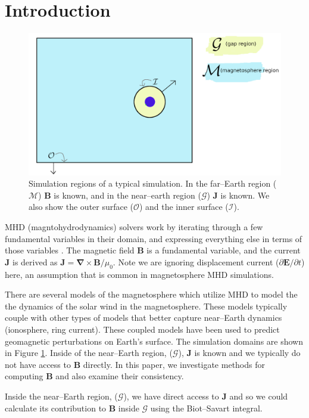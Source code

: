 \documentclass{article}
\newcommand\B{\mathbf{B}}
\newcommand\J{\mathbf{J}}
\newcommand\M{\mathcal{M}}
\newcommand\G{\mathcal{G}}
\newcommand\I{\mathcal{I}}
\newcommand\Out{\mathcal{O}}
\begin{document}
\section{Introduction}

\begin{figure}[H]
  \includegraphics[width=\textwidth]{regions.png}
  \caption{Simulation regions of a typical simulation.
    In the far--Earth region ($\M$) $\B$ is known, and in the near--earth region ($\G$) $\J$ is known.
We also show the outer surface ($\Out$) and the inner surface ($\I$).
    }
  \label{regions}
\end{figure}

MHD (magntohydrodynamics) solvers work by iterating through a few fundamental variables in their domain, and expressing everything else in terms of those variables \citep{Ledvina2008}. The magnetic field $\mathbf{B}$ is a fundamental variable, and the current $\mathbf{J}$ is derived as $\mathbf{J} = \boldsymbol{\nabla} \times \mathbf{B}/\mu_0$. Note we are ignoring displacement current (${\partial \mathbf{E}}/{\partial t}$) here, an assumption that is common in magnetosphere MHD simulations.

There are several models of the magnetosphere which utilize MHD to model the the dynamics of the solar wind in the magnetosphere.
These models typically couple with other types of models that better capture near--Earth dynamics (ionosphere, ring current).
These coupled models have been used to predict geomagnetic perturbations on Earth's surface.
The simulation domains are shown in Figure \ref{regions}. Inside of
the near--Earth region, ($\G$), $\J$ is known and we typically do not have access to $\B$ directly.
In this paper, we investigate methods for computing $\B$ and also examine their consistency.

Inside the near--Earth region, ($\G$), we have direct access to $\J$ and so we could calculate its contribution to $\B$ inside $\G$ using the Biot--Savart integral.
\end{document}
